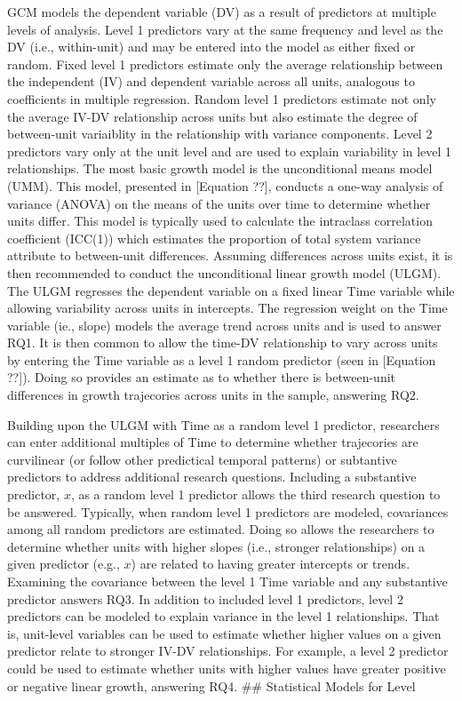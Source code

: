 \documentclass[english,,man]{apa6}
\theoremstyle{definition}
\theoremstyle{definition}
\theoremstyle{definition}
\theoremstyle{remark}
\begin{document}
GCM models the dependent variable (DV) as a result of predictors at
multiple levels of analysis. Level 1 predictors vary at the same
frequency and level as the DV (i.e., within-unit) and may be entered
into the model as either fixed or random. Fixed level 1 predictors
estimate only the average relationship between the independent (IV) and
dependent variable across all units, analogous to coefficients in
multiple regression. Random level 1 predictors estimate not only the
average IV-DV relationship across units but also estimate the degree of
between-unit variaiblity in the relationship with variance components.
Level 2 predictors vary only at the unit level and are used to explain
variability in level 1 relationships. The most basic growth model is the
unconditional means model (UMM). This model, presented in {[}Equation
??{]}, conducts a one-way analysis of variance (ANOVA) on the means of
the units over time to determine whether units differ. This model is
typically used to calculate the intraclass correlation coefficient
(ICC(1)) which estimates the proportion of total system variance
attribute to between-unit differences. Assuming differences across units
exist, it is then recommended to conduct the unconditional linear growth
model (ULGM). The ULGM regresses the dependent variable on a fixed
linear Time variable while allowing variability across units in
intercepts. The regression weight on the Time variable (ie., slope)
models the average trend across units and is used to answer RQ1. It is
then common to allow the time-DV relationship to vary across units by
entering the Time variable as a level 1 random predictor (seen in
{[}Equation ??{]}). Doing so provides an estimate as to whether there is
between-unit differences in growth trajecories across units in the
sample, answering RQ2.

Building upon the ULGM with Time as a random level 1 predictor,
researchers can enter additional multiples of Time to determine whether
trajecories are curvilinear (or follow other predictical temporal
patterns) or subtantive predictors to address additional research
questions. Including a substantive predictor, \(x\), as a random level 1
predictor allows the third research question to be answered. Typically,
when random level 1 predictors are modeled, covariances among all random
predictors are estimated. Doing so allows the researchers to determine
whether units with higher slopes (i.e., stronger relationships) on a
given predictor (e.g., \(x\)) are related to having greater intercepts
or trends. Examining the covariance between the level 1 Time variable
and any substantive predictor answers RQ3. In addition to included level
1 predictors, level 2 predictors can be modeled to explain variance in
the level 1 relationships. That is, unit-level variables can be used to
estimate whether higher values on a given predictor relate to stronger
IV-DV relationships. For example, a level 2 predictor could be used to
estimate whether units with higher values have greater positive or
negative linear growth, answering RQ4. \#\# Statistical Models for Level
\end{document}
